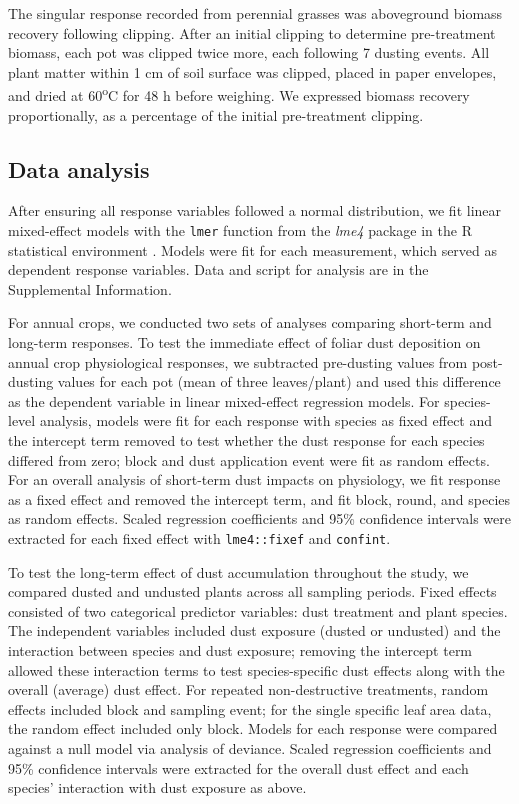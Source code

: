 \documentclass{svjour3}
\begin{document}
The singular response recorded from perennial grasses was aboveground biomass recovery following clipping. 
After an initial clipping to determine pre-treatment biomass, each pot was clipped twice more, each following 7 dusting events. 
All plant matter within 1 cm of soil surface was clipped, placed in paper envelopes, and dried at 60\textsuperscript{o}C for 48 h before weighing.
We expressed biomass recovery proportionally, as a percentage of the initial pre-treatment clipping. 

\subsection{Data analysis}

After ensuring all response variables followed a normal distribution, we fit linear mixed-effect models with the \texttt{lmer} function from the \emph{lme4} package in the \textsf{R} statistical environment \citep{bates2015, rcoreteam2019}. 
Models were fit for each measurement, which served as dependent response variables. 
Data and script for analysis are in the Supplemental Information. 

For annual crops, we conducted two sets of analyses comparing short-term and long-term responses. 
To test the immediate effect of foliar dust deposition on annual crop physiological responses, we subtracted pre-dusting values from post-dusting values for each pot (mean of three leaves/plant)  and used this difference as the dependent variable in linear mixed-effect regression models. 
For species-level analysis, models were fit for each response with species as fixed effect and the intercept term removed to test whether the dust response for each species differed from zero; block and dust application event were fit as random effects. 
For an overall analysis of short-term dust impacts on physiology, we fit response as a fixed effect and removed the intercept term, and fit block, round, and species as random effects. 
Scaled regression coefficients and 95\% confidence intervals were extracted for each fixed effect with \texttt{lme4::fixef} and \texttt{confint}. 
 
To test the long-term effect of dust accumulation throughout the study, we compared dusted and undusted plants across all sampling periods. 
Fixed effects consisted of two categorical predictor variables: dust treatment and plant species. 
The independent variables included dust exposure (dusted or undusted) and the interaction between species and dust exposure; removing the intercept term allowed these interaction terms to test species-specific dust effects along with the overall (average) dust effect. 
For repeated non-destructive treatments, random effects included block and sampling event; for the single specific leaf area data, the random effect included only block.
Models for each response were compared against a null model via analysis of deviance. 
Scaled regression coefficients and 95\% confidence intervals were extracted for the overall dust effect and each species' interaction with dust exposure as above. 
\end{document}
